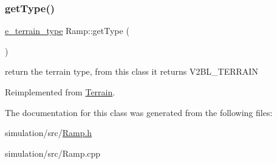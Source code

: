 \subsubsection{\texorpdfstring{get\+Type()}{getType()}}
{\footnotesize\ttfamily \mbox{\hyperlink{_terrain_8h_a6d0b7e83bb7325270c1162bece970fd8}{e\+\_\+terrain\+\_\+type}} Ramp\+::get\+Type (\begin{DoxyParamCaption}{ }\end{DoxyParamCaption})\hspace{0.3cm}{\ttfamily [virtual]}}

return the terrain type, from this class it returns V2\+B\+L\+\_\+\+T\+E\+R\+R\+A\+IN 

Reimplemented from \mbox{\hyperlink{class_terrain_a6cd1220b8e64466cc7a2219efff4141b}{Terrain}}.



The documentation for this class was generated from the following files\+:\begin{DoxyCompactItemize}
\item 
simulation/src/\mbox{\hyperlink{_ramp_8h}{Ramp.\+h}}\item 
simulation/src/Ramp.\+cpp\end{DoxyCompactItemize}
